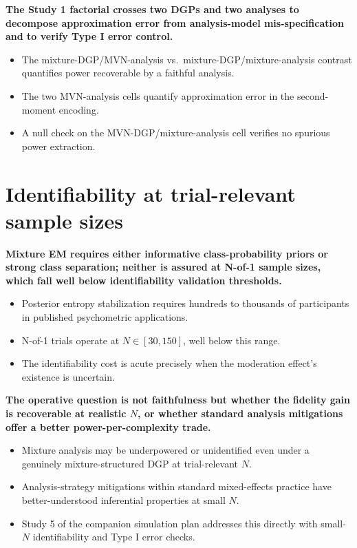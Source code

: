 \documentclass[
  11pt,
]{article}
\begin{document}
\textbf{The Study 1 factorial crosses two DGPs and two analyses to
decompose approximation error from analysis-model mis-specification
and to verify Type I error control.}

\begin{itemize}\setlength{\itemsep}{2pt}\setlength{\parskip}{0pt}
\item The mixture-DGP/MVN-analysis vs.\ mixture-DGP/mixture-analysis
  contrast quantifies power recoverable by a faithful analysis.
\item The two MVN-analysis cells quantify approximation error in the
  second-moment encoding.
\item A null check on the MVN-DGP/mixture-analysis cell verifies no
  spurious power extraction.
\end{itemize}

\section{Identifiability at trial-relevant sample sizes}\label{identifiability-at-trial-relevant-sample-sizes}

\textbf{Mixture EM requires either informative class-probability priors
or strong class separation; neither is assured at N-of-1 sample sizes,
which fall well below identifiability validation thresholds.}

\begin{itemize}\setlength{\itemsep}{2pt}\setlength{\parskip}{0pt}
\item Posterior entropy stabilization requires hundreds to thousands
  of participants in published psychometric applications.
\item N-of-1 trials operate at $N \in [30, 150]$, well below this
  range.
\item The identifiability cost is acute precisely when the moderation
  effect's existence is uncertain.
\end{itemize}

\textbf{The operative question is not faithfulness but whether the
fidelity gain is recoverable at realistic $N$, or whether standard
analysis mitigations offer a better power-per-complexity trade.}

\begin{itemize}\setlength{\itemsep}{2pt}\setlength{\parskip}{0pt}
\item Mixture analysis may be underpowered or unidentified even under
  a genuinely mixture-structured DGP at trial-relevant $N$.
\item Analysis-strategy mitigations within standard mixed-effects
  practice have better-understood inferential properties at small $N$.
\item Study 5 of the companion simulation plan addresses this
  directly with small-$N$ identifiability and Type I error checks.
\end{itemize}
\end{document}

